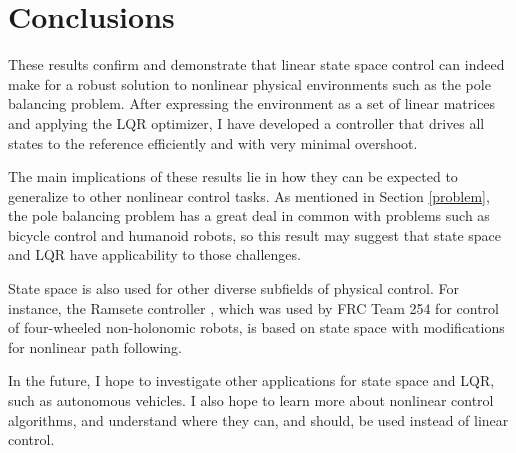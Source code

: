 \documentclass[12pt]{article}
\begin{document}
\section{Conclusions}

These results confirm and demonstrate that linear state space control can indeed make for a robust solution to nonlinear physical environments such as the pole balancing problem. After expressing the environment as a set of linear matrices and applying the LQR optimizer, I have developed a controller that drives all states to the reference efficiently and with very minimal overshoot.

The main implications of these results lie in how they can be expected to generalize to other nonlinear control tasks. As mentioned in Section \ref{problem}, the pole balancing problem has a great deal in common with problems such as bicycle control and humanoid robots, so this result may suggest that state space and LQR have applicability to those challenges.

State space is also used for other diverse subfields of physical control. For instance, the Ramsete controller \cite{ramsete}, which was used by FRC Team 254 for control of four-wheeled non-holonomic robots, is based on state space with modifications for nonlinear path following.

In the future, I hope to investigate other applications for state space and LQR, such as autonomous vehicles. I also hope to learn more about nonlinear control algorithms, and understand where they can, and should, be used instead of linear control.

\printbibliography
\end{document}
